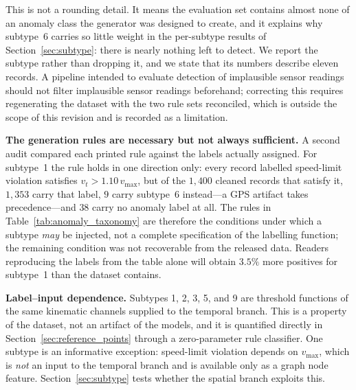 \documentclass[journal]{IEEEtran}
\begin{document}
This is not a rounding detail. It means the evaluation set contains almost
none of an anomaly class the generator was designed to create, and it explains
why subtype~6 carries so little weight in the per-subtype results of
Section~\ref{sec:subtype}: there is nearly nothing left to detect. We report
the subtype rather than dropping it, and we state that its numbers describe
eleven records. A pipeline intended to evaluate detection of implausible
sensor readings should not filter implausible sensor readings beforehand;
correcting this requires regenerating the dataset with the two rule sets
reconciled, which is outside the scope of this revision and is recorded as a
limitation.

\textbf{The generation rules are necessary but not always sufficient.} A
second audit compared each printed rule against the labels actually assigned.
For subtype~1 the rule holds in one direction only: every record labelled
speed-limit violation satisfies $v_t > 1.10\,v_{\max}$, but of the $1{,}400$
cleaned records that satisfy it, $1{,}353$ carry that label, $9$ carry
subtype~6 instead---a GPS artifact takes precedence---and $38$ carry no
anomaly label at all. The rules in Table~\ref{tab:anomaly_taxonomy} are
therefore the conditions under which a subtype \emph{may} be injected, not a
complete specification of the labelling function; the remaining condition was
not recoverable from the released data. Readers reproducing the labels from
the table alone will obtain $3.5\%$ more positives for subtype~1 than the
dataset contains.

\textbf{Label--input dependence.} Subtypes 1, 2, 3, 5, and 9 are threshold functions of the same kinematic channels supplied to the temporal branch. This is a property of the dataset, not an artifact of the models, and it is quantified directly in Section~\ref{sec:reference_points} through a zero-parameter rule classifier. One subtype is an informative exception: speed-limit violation depends on $v_{\max}$, which is \emph{not} an input to the temporal branch and is available only as a graph node feature. Section~\ref{sec:subtype} tests whether the spatial branch exploits this.
\end{document}
